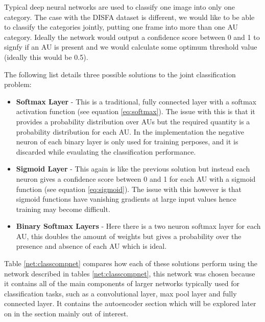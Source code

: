Typical deep neural networks are used to classify
one image into only one category. The case with the DISFA dataset is different, we
would like to be able to classify the categories jointly,  putting one frame into more than
one AU category. Ideally the network would output a confidence score between 0 and 1
to signfy if an AU is present and we would calculate some optimum threshold value
(ideally this would be 0.5).

The following list details three possible solutions to the joint classification problem:

\begin{itemize} \label{sec:binsoft}
  \item {\bf Softmax Layer} - This is a traditional, fully connected layer with
                              a softmax activation function (see equation \ref{eq:softmax}).
                              The issue with this is that it provides a probability distribution over AUs
                              but the required quantity is a probability distribution for each AU. In the implementation
                              the negative neuron of each binary layer is only used for training perposes, and it is
                              discarded while evaulating the classification performance.
  \item {\bf Sigmoid Layer} - This again is like the previous solution but instead each neuron gives a confidence
                              score between 0 and 1 for each AU with a sigmoid function (see equation \ref{eq:sigmoid}).
                              The issue with this however is that sigmoid
                              functions have vanishing gradients at large input values
                              hence training may become difficult.
  \item {\bf Binary Softmax Layers} - Here there is a two neuron softmax layer
                                      for each AU, this doubles the amount of weights
                                      but gives a probability over the presence and
                                      absence of each AU which is ideal.
\end{itemize}

Table \ref{net:classcompnet} compares how each of these solutions perform using the network described in
tables \ref{net:classcompnet}, this network was chosen because it contains all of the main
components of larger networks typically used for classification tasks, such as a convolutional
layer, max pool layer and fully connected layer. It contains the autoencoder section which will be
explored later on in the section mainly out of interest.

